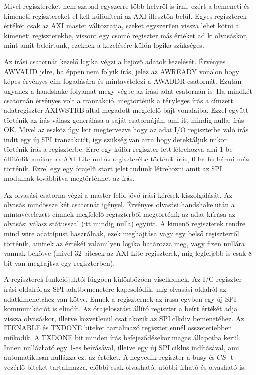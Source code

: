 \documentclass[a4paper,11pt]{article}
\begin{document}
Mivel regisztereket nem szabad egyszerre több helyről is írni, ezért a bemeneti és kimeneti regisztereket el kell különíteni az AXI illesztőn belül. Egyes regiszterek értékét csak az AXI master változtatja, ezeket egyszerűen vissza lehet kötni a kimeneti regiszterekbe, viszont egy csomó regiszter más értéket ad ki olvasáskor, mint amit beleírtunk, ezeknek a kezelésére külön logika szükséges.

Az írási csatornát kezelő logika végzi a bejövő adatok kezelését. Érvényes AWVALID jelre, ha éppen nem folyik írás, jelez az AWREADY vonalon hogy képes érvényes cím fogadására és mintavételezi a AWADDR csatornát. Ezután ugyanez a handshake folyamat megy végbe az írási adat csatornán is. Ha mindkét csatornán érvényes volt a tranzakció, megtörténik a tényleges írás a címzett adatregiszter AXI\textunderscore WSTRB által megadott megfelelő bájt vonalaiba. Ezzel együtt történik az írás válasz generálása a saját csatornáján, ami itt mindig nulla: írás OK. Mivel az eszköz úgy lett megtervezve hogy az adat I/O regiszterbe való írás indít egy új SPI tranzakciót, így szükség van arra hogy detektáljuk mikor történik írás a regiszterbe. Erre egy külön regiszter lett létrehozva ami 1-be állítódik amikor az AXI Lite nullás regiszterébe történik írás, 0-ba ha bármi más történik. Ezzel egy egy órajelű start jelet tudunk létrehozni amit az SPI modulnak továbbítva megtörténhet az írás.

Az olvasási csatorna végzi a master felől jövő írási kérések kiszolgálását. Az olvasás mindössze két csatornát igényel. Érvényes olvasási handshake után a mintavételezett címnek megfelelő regiszterből megtörténik az adat kiírása az olvasási válasz státusszal (itt mindig nulla) együtt. A kimenő regiszterek rendre mind wire adattípust használnak, ezek meghajtása vagy egy belső regiszterről történik, aminek az értékét valamilyen logika határozza meg, vagy fixen nullára vannak bekötve (mivel 32 bitesek az AXI Lite regiszterek, míg legfeljebb is csak 8 bit van meghajtva egy regiszterben).

A regiszterek funkciójuktól függően különbözően viselkednek. Az I/O regiszter írási oldalról az SPI adatbemenetére kapcsolódik, míg olvasási oldalról az adatkimenetéhez van kötve. Ennek a regiszternek az írása egyben egy új SPI kommunikációt is elindít. Az órajelosztást állító regiszter a beírt értékét adja vissza olvasáskor, illetve közvetlenül csatlakozik az SPI clkdiv bemenetéhez. Az ITENABLE és TXDONE biteket tartalmazó regiszter ennél összetettebben működik. A TXDONE bit minden írás befejeződésekor magas állapotba kerül. Innen nullázható egy 1-es beírásával, illetve egy új SPI ciklus indításával, ami automatikusan nullázza ezt az értéket. A negyedik regiszter a busy és $\overline{CS}$ -t vezérlő biteket tartalmazza, előbbi csak olvasható, utóbbi írható és olvasható is.
\end{document}
